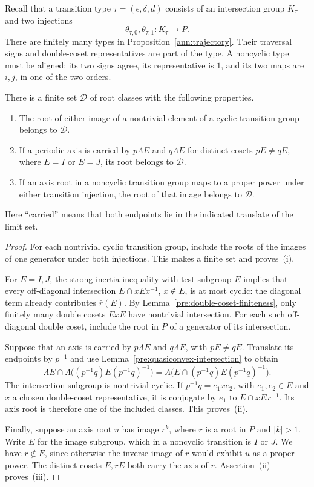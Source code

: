 Recall that a transition type $\tau=(\epsilon,\delta,d)$ consists of
an intersection group $K_\tau$ and two injections
\[
 \theta_{\tau,0},\theta_{\tau,1}:K_\tau\longrightarrow P.
\]
There are finitely many types in Proposition~\ref{ann:trajectory}.
Their traversal signs and double-coset representatives are part of the
type.  A noncyclic type must be aligned: its two signs agree, its
representative is $1$, and its two maps are $i,j$, in one of the two
orders.

\begin{lemma}\label{stat:finite-roots}
There is a finite set $\mathcal D$ of root classes with the following
properties.
\begin{enumerate}[label=\textup{(\roman*)}]
\item The root of either image of a nontrivial element of a cyclic
transition group belongs to $\mathcal D$.
\item If a periodic axis is carried by $p\Lambda E$ and $q\Lambda E$
for distinct cosets $pE\ne qE$, where $E=I$ or $E=J$, its root
belongs to $\mathcal D$.
\item If an axis root in a noncyclic transition group maps to a proper
power under either transition injection, the root of that image
belongs to $\mathcal D$.
\end{enumerate}
Here ``carried'' means that both endpoints lie in the indicated
translate of the limit set.
\end{lemma}
\begin{proof}
For each nontrivial cyclic transition group, include the roots of the
images of one generator under both injections.  This makes a finite
set and proves~(i).

For $E=I,J$, the strong inertia inequality with test subgroup $E$
implies that every off-diagonal intersection
$E\cap xEx^{-1}$, $x\notin E$, is at most cyclic: the diagonal term
already contributes $\bar r(E)$.  By
Lemma~\ref{pre:double-coset-finiteness}, only finitely many double
cosets $ExE$ have nontrivial intersection.  For each such off-diagonal
double coset, include the root in $P$ of a generator of its
intersection.

Suppose that an axis is carried by $p\Lambda E$ and $q\Lambda E$,
with $pE\ne qE$.  Translate its endpoints by $p^{-1}$ and use
Lemma~\ref{pre:quasiconvex-intersection} to obtain
\[
 \Lambda E\cap\Lambda\bigl((p^{-1}q)E(p^{-1}q)^{-1}\bigr)
 =\Lambda\bigl(E\cap(p^{-1}q)E(p^{-1}q)^{-1}\bigr).
\]
The intersection subgroup is nontrivial cyclic.  If
$p^{-1}q=e_1xe_2$, with $e_1,e_2\in E$ and $x$ a chosen
double-coset representative, it is conjugate by $e_1$ to
$E\cap xEx^{-1}$.  Its axis root is therefore one of the included
classes.  This proves~(ii).

Finally, suppose an axis root $u$ has image $r^k$, where $r$ is a
root in $P$ and $|k|>1$.  Write $E$ for the image subgroup, which in a
noncyclic transition is $I$ or $J$.  We have $r\notin E$, since
otherwise the inverse image of $r$ would exhibit $u$ as a proper
power.  The distinct cosets $E,rE$ both carry the axis of $r$.
Assertion~(ii) proves~(iii).
\end{proof}

